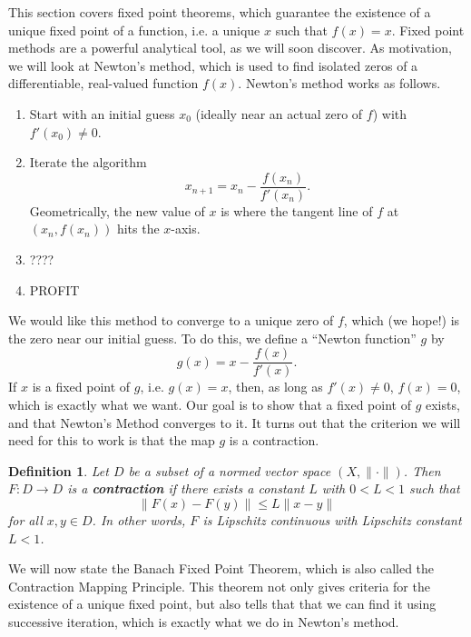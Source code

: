 \documentclass[12pt]{amsart}         %
\newtheorem{definition}{Definition}[section]
\theoremstyle{remark}
\begin{document}
This section covers fixed point theorems, which guarantee the existence of a unique fixed point of a function, i.e. a unique $x$ such that $f(x) = x$. Fixed point methods are a powerful analytical tool, as we will soon discover. As motivation, we will look at Newton's method, which is used to find isolated zeros of a differentiable, real-valued function $f(x)$. Newton's method works as follows.

\begin{enumerate}
\item Start with an initial guess $x_0$ (ideally near an actual zero of $f$) with $f'(x_0) \neq 0$.
\item Iterate the algorithm 
\[
x_{n+1} = x_n - \frac{f(x_n)}{f'(x_n)}.
\]
Geometrically, the new value of $x$ is where the tangent line of $f$ at $(x_n, f(x_n))$ hits the $x$-axis.
\item ????
\item PROFIT
\end{enumerate}

We would like this method to converge to a unique zero of $f$, which (we hope!) is the zero near our initial guess. To do this, we define a ``Newton function'' $g$ by
\[
g(x) = x - \frac{f(x)}{f'(x)}.
\]
If $x$ is a fixed point of $g$, i.e. $g(x) = x$, then, as long as $f'(x) \neq 0$, $f(x) = 0$, which is exactly what we want. Our goal is to show that a fixed point of $g$ exists, and that Newton's Method converges to it. It turns out that the criterion we will need for this to work is that the map $g$ is a contraction.

\begin{definition}Let $D$ be a subset of a normed vector space $(X, \|\cdot\|)$. Then $F: D \rightarrow D$ is a \textbf{contraction} if there exists a constant $L$ with $0 < L < 1$ such that 
\[
\|F(x) - F(y)\| \leq L \|x - y\|
\]
for all $x, y \in D$. In other words, $F$ is Lipschitz continuous with Lipschitz constant $L < 1$.
\end{definition}

We will now state the Banach Fixed Point Theorem, which is also called the Contraction Mapping Principle. This theorem not only gives criteria for the existence of a unique fixed point, but also tells that that we can find it using successive iteration, which is exactly what we do in Newton's method. 
\end{document}
